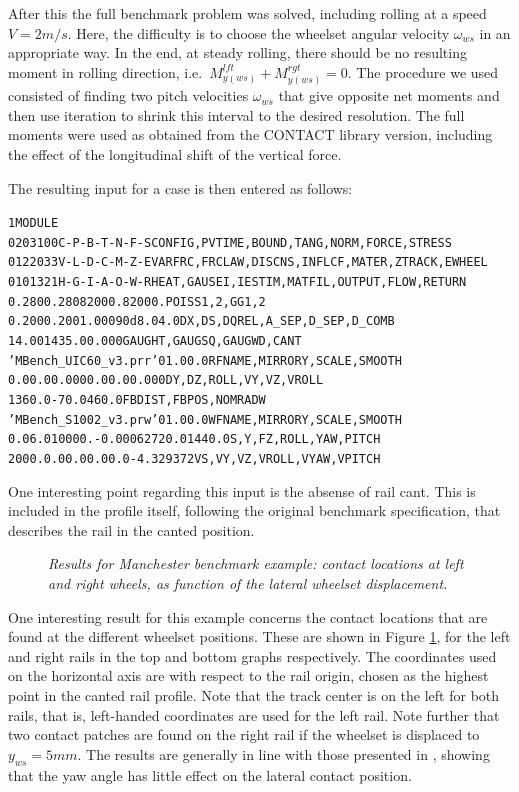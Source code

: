 \documentclass[12pt]{report}
\begin{document}
After this the full benchmark problem was solved, including rolling at a
speed $V=2\unit{m/s}$. Here, the difficulty is to choose the wheelset angular
velocity $\omega_{ws}$ in an appropriate way. In the end, at steady
rolling, there should be no resulting moment in rolling direction, i.e.\
$M_{y(ws)}^{lft} + M_{y(ws)}^{rgt} =0$. The procedure we used consisted
of finding two pitch velocities $\omega_{ws}$ that give opposite net
moments and then use iteration to shrink this interval to the desired
resolution. The full moments were used as obtained from the CONTACT library
version, including the effect of the longitudinal shift of the vertical
force.

The resulting input for a case is then entered as follows:
\begin{alltt}\small

  1 MODULE
 0203100    C-P-B-T-N-F-S   CONFIG, PVTIME, BOUND,  TANG,   NORM,   FORCE,  STRESS
 0122033    V-L-D-C-M-Z-E   VARFRC, FRCLAW, DISCNS, INFLCF, MATER,  ZTRACK, EWHEEL
 0101321    H-G-I-A-O-W-R     HEAT, GAUSEI, IESTIM, MATFIL, OUTPUT, FLOW,   RETURN
  0.280   0.280   82000.  82000.                 POISS 1,2,  GG 1,2
  0.200   0.200   1.000   90d   8.0   4.0        DX, DS, DQREL, A\_SEP,D\_SEP,D\_COMB
   14.0     0    1435.0   0.000                  GAUGHT, GAUGSQ, GAUGWD, CANT
  'MBench\_UIC60\_v3.prr'   0     1.0   0.0        RFNAME, MIRRORY, SCALE, SMOOTH
     0.0    0.0   0.000   0.0   0.0   0.000      DY, DZ, ROLL, VY, VZ, VROLL
  1360.0  -70.0   460.0                          FBDIST, FBPOS, NOMRADW
  'MBench\_S1002\_v3.prw'   0     1.0   0.0        WFNAME, MIRRORY, SCALE, SMOOTH
  0.0  6.0  10000. -0.0006272  0.0144  0.0       S,  Y,  FZ, ROLL,  YAW,  PITCH
 2000. 0.0    0.0   0.0        0.0    -4.329372  VS, VY, VZ, VROLL, VYAW, VPITCH
\end{alltt}
One interesting point regarding this input is the absense of rail cant. This
is included in the profile itself, following the original benchmark
specification, that describes the rail in the canted position.

\begin{figure}[bt]
\centering
{}
\caption{\em Results for Manchester benchmark example: contact locations at
left and right wheels, as function of the lateral wheelset displacement.}
\label{fig:mbench_cpos}
\end{figure}

One interesting result for this example concerns the contact locations that
are found at the different wheelset positions. These are shown in Figure
\ref{fig:mbench_cpos}, for the left and right rails in the top and bottom
graphs respectively. The coordinates used on the horizontal axis are with
respect to the rail origin, chosen as the highest point in the canted rail
profile. Note that the track center is on the left for both rails, that is,
left-handed coordinates are used for the left rail. Note further that two
contact patches are found on the right rail if the wheelset is displaced to
$y_{ws}=5\unit{mm}$. The results are generally in line with those presented in
\cite{Shackleton2008}, showing that the yaw angle has little effect on the
lateral contact position.
\end{document}
